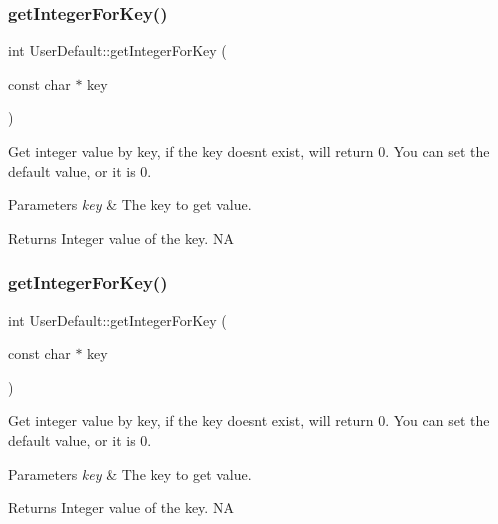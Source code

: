 \subsubsection{\texorpdfstring{get\+Integer\+For\+Key()}{getIntegerForKey()}\hspace{0.1cm}{\footnotesize\ttfamily [1/4]}}
{\footnotesize\ttfamily int User\+Default\+::get\+Integer\+For\+Key (\begin{DoxyParamCaption}\item[{const char $\ast$}]{key }\end{DoxyParamCaption})}

Get integer value by key, if the key doesn\textquotesingle{}t exist, will return 0. You can set the default value, or it is 0. 
\begin{DoxyParams}{Parameters}
{\em key} & The key to get value. \\
\hline
\end{DoxyParams}
\begin{DoxyReturn}{Returns}
Integer value of the key.  NA 
\end{DoxyReturn}
\mbox{\label{classUserDefault_a76088fadfecbeaf693c002d5bdb8c622}} 
\subsubsection{\texorpdfstring{get\+Integer\+For\+Key()}{getIntegerForKey()}\hspace{0.1cm}{\footnotesize\ttfamily [2/4]}}
{\footnotesize\ttfamily int User\+Default\+::get\+Integer\+For\+Key (\begin{DoxyParamCaption}\item[{const char $\ast$}]{key }\end{DoxyParamCaption})}

Get integer value by key, if the key doesn\textquotesingle{}t exist, will return 0. You can set the default value, or it is 0. 
\begin{DoxyParams}{Parameters}
{\em key} & The key to get value. \\
\hline
\end{DoxyParams}
\begin{DoxyReturn}{Returns}
Integer value of the key.  NA 
\end{DoxyReturn}
\mbox{\label{classUserDefault_ad40bc03484f1aedd248f0e25d5de7822}} 
